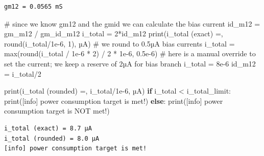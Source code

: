\documentclass[
  a4paper,
  DIV=11,
  numbers=noendperiod]{scrartcl}
\newenvironment{Shaded}{\begin{snugshade}}{\end{snugshade}}
\newcommand{\BuiltInTok}[1]{\textcolor[rgb]{0.00,0.23,0.31}{#1}}
\newcommand{\CommentTok}[1]{\textcolor[rgb]{0.37,0.37,0.37}{#1}}
\newcommand{\ControlFlowTok}[1]{\textcolor[rgb]{0.00,0.23,0.31}{\textbf{#1}}}
\newcommand{\DecValTok}[1]{\textcolor[rgb]{0.68,0.00,0.00}{#1}}
\newcommand{\FloatTok}[1]{\textcolor[rgb]{0.68,0.00,0.00}{#1}}
\newcommand{\NormalTok}[1]{\textcolor[rgb]{0.00,0.23,0.31}{#1}}
\newcommand{\OperatorTok}[1]{\textcolor[rgb]{0.37,0.37,0.37}{#1}}
\newcommand{\StringTok}[1]{\textcolor[rgb]{0.13,0.47,0.30}{#1}}
\begin{document}
\begin{tcolorbox}
\begin{verbatim}
gm12 = 0.0565 mS
\end{verbatim}

\begin{Shaded}
\begin{Highlighting}[]
\CommentTok{\# since we know gm12 and the gmid we can calculate the bias current}
\NormalTok{id\_m12 }\OperatorTok{=}\NormalTok{ gm\_m12 }\OperatorTok{/}\NormalTok{ gm\_id\_m12}
\NormalTok{i\_total }\OperatorTok{=} \DecValTok{2}\OperatorTok{*}\NormalTok{id\_m12}
\BuiltInTok{print}\NormalTok{(}\StringTok{\textquotesingle{}i\_total (exact) =\textquotesingle{}}\NormalTok{, }\BuiltInTok{round}\NormalTok{(i\_total}\OperatorTok{/}\FloatTok{1e{-}6}\NormalTok{, }\DecValTok{1}\NormalTok{), }\StringTok{\textquotesingle{}µA\textquotesingle{}}\NormalTok{)}
\CommentTok{\# we round to 0.5µA bias currents}
\NormalTok{i\_total }\OperatorTok{=} \BuiltInTok{max}\NormalTok{(}\BuiltInTok{round}\NormalTok{(i\_total }\OperatorTok{/} \FloatTok{1e{-}6} \OperatorTok{*} \DecValTok{2}\NormalTok{) }\OperatorTok{/} \DecValTok{2} \OperatorTok{*} \FloatTok{1e{-}6}\NormalTok{, }\FloatTok{0.5e{-}6}\NormalTok{)}
\CommentTok{\# here is a manual override to set the current; we keep a reserve of 2µA for bias branch}
\NormalTok{i\_total }\OperatorTok{=} \FloatTok{8e{-}6}
\NormalTok{id\_m12 }\OperatorTok{=}\NormalTok{ i\_total}\OperatorTok{/}\DecValTok{2}

\BuiltInTok{print}\NormalTok{(}\StringTok{\textquotesingle{}i\_total (rounded) =\textquotesingle{}}\NormalTok{, i\_total}\OperatorTok{/}\FloatTok{1e{-}6}\NormalTok{, }\StringTok{\textquotesingle{}µA\textquotesingle{}}\NormalTok{)}
\ControlFlowTok{if}\NormalTok{ i\_total }\OperatorTok{\textless{}}\NormalTok{ i\_total\_limit:}
    \BuiltInTok{print}\NormalTok{(}\StringTok{\textquotesingle{}[info] power consumption target is met!\textquotesingle{}}\NormalTok{)}
\ControlFlowTok{else}\NormalTok{:}
    \BuiltInTok{print}\NormalTok{(}\StringTok{\textquotesingle{}[info] power consumption target is NOT met!\textquotesingle{}}\NormalTok{) }
\end{Highlighting}
\end{Shaded}

\begin{verbatim}
i_total (exact) = 8.7 µA
i_total (rounded) = 8.0 µA
[info] power consumption target is met!
\end{verbatim}


\end{tcolorbox}
\end{document}
